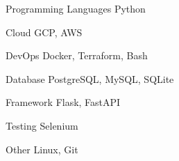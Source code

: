 

\begin{cvskills}

  \cvskill
    {Programming Languages} %
    {Python} %

  \cvskill
    {Cloud} %
    {GCP, AWS} %

  \cvskill
    {DevOps} %
    {Docker, Terraform, Bash} %

  \cvskill
    {Database} %
    {PostgreSQL, MySQL, SQLite} %

  \cvskill
    {Framework} %
    {Flask, FastAPI} %

  \cvskill
    {Testing} %
    {Selenium} %

  \cvskill
    {Other} %
    {Linux, Git} %
\end{cvskills}
